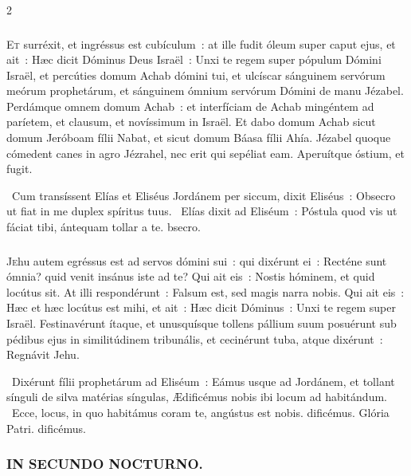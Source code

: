 \documentclass[9pt,twoside]{extarticle}
\begin{document}
\begin{multicols}{2}
\subsubsection*{\center {}}
\lettrine{E}t surréxit, et ingréssus est cubículum~: at ille fudit óleum super caput ejus, et ait~: Hæc dicit Dóminus Deus Israël~: Unxi te regem super pópulum Dómini Israël,
et percúties domum Achab dómini tui, et ulcíscar sánguinem servórum meórum prophetárum, et sánguinem ómnium servórum Dómini de manu Jézabel.
Perdámque omnem domum Achab~: et interfíciam de Achab mingéntem ad paríetem, et clausum, et novíssimum in Israël.
Et dabo domum Achab sicut domum Jeróboam fílii Nabat, et sicut domum Báasa fílii Ahía.
Jézabel quoque cómedent canes in agro Jézrahel, nec erit qui sepéliat eam. Aperuítque óstium, et fugit.

\begin{tightlist}{}
\item {}~Cum transíssent Elías et Eliséus Jordánem per siccum, dixit Eliséus~: \textred{*} Obsecro ut fiat in me duplex spíritus tuus. ~Elías dixit ad Eliséum~: Póstula quod vis ut fáciat tibi, ántequam tollar a te. bsecro.
\end{tightlist}

\subsubsection*{\center {}}
\lettrine{J}ehu autem egréssus est ad servos dómini sui~: qui dixérunt ei~: Recténe sunt ómnia? quid venit insánus iste ad te? Qui ait eis~: Nostis hóminem, et quid locútus sit.
At illi respondérunt~: Falsum est, sed magis narra nobis. Qui ait eis~: Hæc et hæc locútus est mihi, et ait~: Hæc dicit Dóminus~: Unxi te regem super Israël.
Festinavérunt ítaque, et unusquísque tollens pállium suum posuérunt sub pédibus ejus in similitúdinem tribunális, et cecinérunt tuba, atque dixérunt~: Regnávit Jehu.

\begin{tightlist}{}
\item {}~Dixérunt fílii prophetárum ad Eliséum~: Eámus usque ad Jordánem, et tollant sínguli de silva matérias síngulas, \textred{*} Ædificémus nobis ibi locum ad habitándum. ~Ecce, locus, in quo habitámus coram te, angústus est nobis. dificémus. Glória Patri. dificémus.
\end{tightlist}

\subsubsection*{\center \textsc{IN SECUNDO NOCTURNO.}}

\end{multicols}
\end{document}
